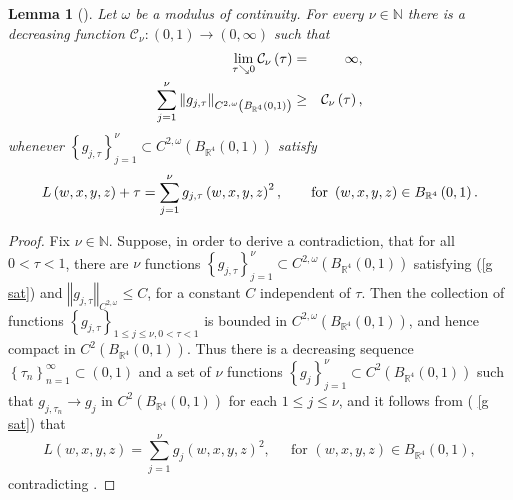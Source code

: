 \documentclass{amsart}
\theoremstyle{plain}
\newtheorem{lemma}[theorem]{Lemma}
\numberwithin{equation}{section}
\begin{document}
\begin{lemma}[{\protect\cite[Theorem 1.2 (d)]{BoBrCoPe}}]
\label{g control}Let $\omega $ be a modulus of continuity. For every $\nu
\in \mathbb{N}$ there is a decreasing function $\mathcal{C}_{\nu }:\left(
0,1\right) \rightarrow \left( 0,\infty \right) $ such that%
\begin{eqnarray*}
\lim_{\tau \searrow 0}\mathcal{C}_{\nu }\left( \tau \right) &=&\infty , \\
\sum_{j=1}^{\nu }\left\Vert g_{j,\tau }\right\Vert _{C^{2,\omega }\left( B_{%
\mathbb{R}^{4}}\left( 0,1\right) \right) } &\geq &\mathcal{C}_{\nu }\left(
\tau \right) ,
\end{eqnarray*}%
whenever $\left\{ g_{j,\tau }\right\} _{j=1}^{\nu }\subset C^{2,\omega
}\left( B_{\mathbb{R}^{4}}\left( 0,1\right) \right) $ satisfy%
\begin{equation}
L\left( w,x,y,z\right) +\tau =\sum_{j=1}^{\nu }g_{j,\tau }\left(
w,x,y,z\right) ^{2},\ \ \ \ \ \text{\ for }\left( w,x,y,z\right) \in B_{%
\mathbb{R}^{4}}\left( 0,1\right) .  \label{g sat}
\end{equation}
\end{lemma}

\begin{proof}
Fix $\nu \in \mathbb{N}$. Suppose, in order to derive a contradiction, that
for all $0<\tau <1$, there are $\nu $ functions $\left\{ g_{j,\tau }\right\}
_{j=1}^{\nu }\subset C^{2,\omega }\left( B_{\mathbb{R}^{4}}\left( 0,1\right)
\right) $ satisfying (\ref{g sat}) and $\left\Vert g_{j,\tau }\right\Vert
_{C^{2,\omega }}\leq C$, for a constant $C$ independent of $\tau $. Then the
collection of functions $\left\{ g_{j,\tau }\right\} _{1\leq j\leq \nu
,0<\tau <1}$ is bounded in $C^{2,\omega }\left( B_{\mathbb{R}^{4}}\left(
0,1\right) \right) $, and hence compact in $C^{2}\left( B_{\mathbb{R}%
^{4}}\left( 0,1\right) \right) $. Thus there is a decreasing sequence $%
\left\{ \tau _{n}\right\} _{n=1}^{\infty }\subset \left( 0,1\right) $ and a
set of $\nu $ functions $\left\{ g_{j}\right\} _{j=1}^{\nu }\subset
C^{2}\left( B_{\mathbb{R}^{4}}\left( 0,1\right) \right) $ such that $%
g_{j,\tau _{n}}\rightarrow g_{j}$ in $C^{2}\left( B_{\mathbb{R}^{4}}\left(
0,1\right) \right) $ for each $1\leq j\leq \nu $, and it follows from (%
\ref{g sat}) that%
\begin{equation*}
L\left( w,x,y,z\right) =\sum_{j=1}^{\nu }g_{j}\left( w,x,y,z\right) ^{2},\ \
\ \ \ \text{\ for }\left( w,x,y,z\right) \in B_{\mathbb{R}^{4}}\left(
0,1\right) ,
\end{equation*}%
contradicting \cite[Theorem 1.2 (c)]{BoBrCoPe}.
\end{proof}
\end{document}
